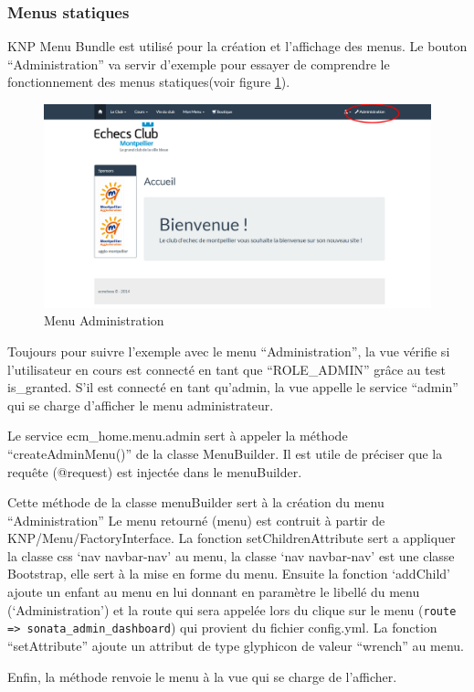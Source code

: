 \documentclass[a4paper,12pt, notitlepage]{report}
\begin{document}
\subsubsection{Menus statiques}
KNP Menu Bundle est utilisé pour la création et l’affichage des menus.
Le bouton “Administration” va servir d’exemple pour essayer de comprendre le fonctionnement des menus statiques(voir figure \ref{btn-admin}).
\begin{figure} 
    \caption{Menu Administration}  
    \label{btn-admin}
    \centering
    \includegraphics[scale=0.3]{images/btn-admin.png}
\end{figure}

Toujours pour suivre l’exemple avec le menu “Administration”, la vue vérifie si l’utilisateur en cours est connecté en tant que “ROLE\_ADMIN” grâce au test is\_granted.
S’il est connecté en tant qu'admin, la vue appelle le \gls{service} “admin” qui se charge d'afficher le menu administrateur.

Le \gls{service} ecm\_home.menu.admin sert à appeler la méthode “createAdminMenu()” de la classe MenuBuilder. Il est utile de préciser que la requête (@request) est injectée dans le menuBuilder.

Cette méthode de la classe menuBuilder sert à la création du menu “Administration”
Le menu retourné (menu) est contruit à partir de KNP/Menu/FactoryInterface.
La fonction setChildrenAttribute sert a appliquer la classe css ‘nav navbar-nav’ au menu,
la classe ‘nav navbar-nav’ est une classe Bootstrap, elle sert à la mise en forme du menu.
Ensuite la fonction ‘addChild’ ajoute un enfant au menu en lui donnant en paramètre le libellé du menu (‘Administration’) et la route qui sera appelée lors du clique sur le menu (\verb?route => sonata_admin_dashboard?) qui provient du fichier config.yml.
La fonction “setAttribute” ajoute un attribut de type glyphicon de valeur “wrench” au menu.

Enfin, la méthode renvoie le menu à la vue qui se charge de l’afficher.
\end{document}
